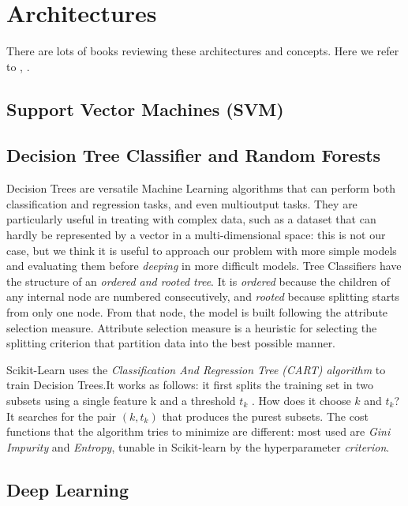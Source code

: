 \documentclass[%
 reprint,
 amsmath,amssymb,
 aps,
]{revtex4-1}
\begin{document}
\section{\label{sec:level1}Architectures}
There are lots of books reviewing these architectures and concepts. Here we refer to \cite{geron2017hands} , \cite{bishop2006pattern}
\cite{hertz1991introduction}.

\subsection{\label{sec:level2}Support Vector Machines (SVM)}

\subsection{\label{sec:level2}Decision Tree Classifier and Random Forests}

Decision Trees are versatile Machine Learning algorithms that can perform both classification and regression tasks, and even multioutput tasks. They are particularly useful in treating with complex data, such as a dataset that can hardly be represented by a vector in a multi-dimensional space: this is not our case, but we think it is useful to approach our problem with more simple models and evaluating them before \textit{deeping} in more difficult models.
Tree Classifiers have the structure of an \textit{ordered and rooted tree}. It is \textit{ordered} because the children of any internal node are numbered consecutively, and \textit{rooted} because splitting starts from only one node.
From that node, the model is built following the attribute selection measure.
Attribute selection measure is a heuristic for selecting the splitting criterion that partition data into the best possible manner.

Scikit-Learn uses the \textit{Classification And Regression Tree (CART) algorithm} to train Decision Trees.It works as follows: it first splits the training set in two subsets using a single feature k and a threshold $t_k$ . How does it choose $k$ and $t_k$? It searches for the pair $(k, t_k)$ that produces the purest subsets. The cost functions that the algorithm tries to minimize are different: most used are \textit{Gini Impurity} and \textit{Entropy}, tunable in Scikit-learn by the hyperparameter \textit{criterion}.
\subsection{\label{sec:level2}Deep Learning}
\end{document}
